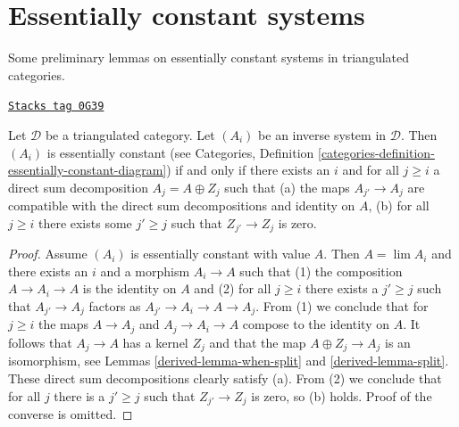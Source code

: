 \section{Essentially constant systems}
\label{derived-section-essentially-constant}
Some preliminary lemmas on essentially constant systems in triangulated
categories.

\begin{lemma}
\label{derived-lemma-essentially-constant}
\href{https://stacks.math.columbia.edu/tag/0G39}{\texttt{Stacks tag 0G39}}

Let $\mathcal{D}$ be a triangulated category. Let $(A_i)$ be an inverse system
in $\mathcal{D}$. Then $(A_i)$ is essentially constant (see
Categories, Definition
\ref{categories-definition-essentially-constant-diagram})
if and only if there exists an $i$ and for all $j \geq i$ a direct sum
decomposition $A_j = A \oplus Z_j$ such that
(a) the maps $A_{j'} \to A_j$ are compatible with the direct sum
decompositions and identity on $A$, (b) for all $j \geq i$ there exists some
$j' \geq j$ such that $Z_{j'} \to Z_j$ is zero.
\end{lemma}

\begin{proof}

Assume $(A_i)$ is essentially constant with value $A$. Then $A = \lim A_i$
and there exists an $i$ and a morphism $A_i \to A$ such that (1)
the composition $A \to A_i \to A$ is the identity on $A$ and (2) for all
$j \geq i$ there exists a $j' \geq j$ such that $A_{j'} \to A_j$ factors as
$A_{j'} \to A_i \to A \to A_j$. From (1) we conclude that for $j \geq i$
the maps $A \to A_j$ and $A_j \to A_i \to A$ compose to the identity on $A$.
It follows that $A_j \to A$ has a kernel $Z_j$ and that
the map $A \oplus Z_j \to A_j$ is an isomorphism, see
Lemmas \ref{derived-lemma-when-split} and \ref{derived-lemma-split}.
These direct sum decompositions clearly satisfy (a).
From (2) we conclude that for all $j$ there is a $j' \geq j$ such that
$Z_{j'} \to Z_j$ is zero, so (b) holds. Proof of the converse is omitted.
\end{proof}

